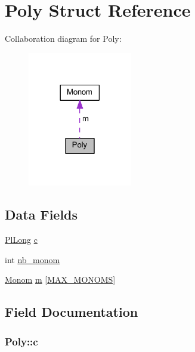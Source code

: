 \hypertarget{structPoly}{}\section{Poly Struct Reference}
\label{structPoly}


Collaboration diagram for Poly\+:\nopagebreak
\begin{figure}[H]
\begin{center}
\leavevmode
\includegraphics[width=129pt]{structPoly__coll__graph}
\end{center}
\end{figure}
\subsection*{Data Fields}
\begin{DoxyCompactItemize}
\item 
\hyperlink{gprolog_8h_a4d005b136d7fb28537eb1815f7868b63}{Pl\+Long} \hyperlink{structPoly_ac87064f885d4389f545b4194de01f60e}{c}
\item 
int \hyperlink{structPoly_a23949f807fc70dcf7c1b7b18bb48be0c}{nb\+\_\+monom}
\item 
\hyperlink{structMonom}{Monom} \hyperlink{structPoly_a1bae103a920d8182006ef10891c87906}{m} \mbox{[}\hyperlink{math__supp_8c_a330fef6c0cdba49e7f9f7351a6f5e227}{M\+A\+X\+\_\+\+M\+O\+N\+O\+MS}\mbox{]}
\end{DoxyCompactItemize}


\subsection{Field Documentation}
\subsubsection[{\texorpdfstring{c}{c}}]{ Poly\+::c}\hypertarget{structPoly_ac87064f885d4389f545b4194de01f60e}{}\label{structPoly_ac87064f885d4389f545b4194de01f60e}
